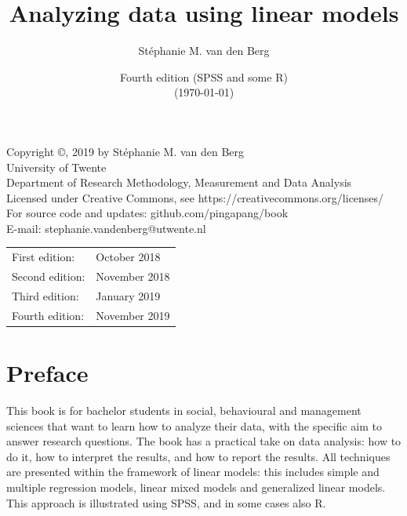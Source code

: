 \documentclass[]{book}\usepackage[]{graphicx}\usepackage[]{color}
\title{Analyzing data using linear models}
\author{St\'ephanie M. van den Berg}
\date{Fourth edition (SPSS and some R)\\ (\today)}
\begin{document}
\frontmatter

\maketitle

\pagestyle{empty}
\begingroup
\footnotesize
\parindent 0pt
\parskip \baselineskip


Copyright \copyright {}, 2019 by St\'ephanie M. van den Berg \\
University of Twente\\
Department of Research Methodology, Measurement and Data Analysis\\
Licensed under Creative Commons, see https://creativecommons.org/licenses/\\
For source code and updates: github.com/pingapang/book\\
E-mail: stephanie.vandenberg@utwente.nl\\
\ccbyncsa

   

 

\begin{center}
\begin{tabular}{ll}
First edition:  & October 2018 \\
Second edition:  & November 2018 \\
Third edition:  & January 2019 \\
Fourth edition: & November 2019\\
\end{tabular}
\end{center}




\endgroup
\clearpage












\chapter*{Preface}
This book is for bachelor students in social, behavioural and management sciences that want to learn how to analyze their data, with the specific aim to answer research questions. The book has a practical take on data analysis: how to do it, how to interpret the results, and how to report the results. All techniques are presented within the framework of linear models: this includes simple and multiple regression models, linear mixed models and generalized linear models. This approach is illustrated using SPSS, and in some cases also R.
\end{document}
